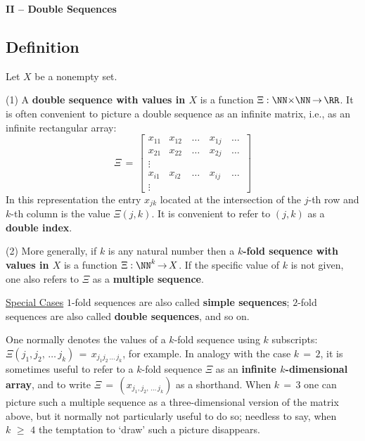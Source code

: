 {\V
\V

        {\bf II -- Double Sequences}

\V
\V


            \subsection{\small{\bf Definition}}
            \label{DefC100.70}

        Let $X$ be a nonempty set.

\V

        (1) A {\bf double sequence with values in $X$} is a function ${\Xi}:{\NN}{\times}{\NN} \,{\rightarrow}\, {\RR}$.
    It is often convenient to picture a double sequence as an infinite matrix, i.e., as an infinite rectangular array:
        \begin{displaymath}
        {\Xi} \,=\, \left[
        \begin{array}{llclc}
        x_{11} & x_{12} & \,{\ldots}\,& x_{1j} & \,{\ldots}\, \\
        x_{21} & x_{22} & \,{\ldots}\,& x_{2j} & \,{\ldots}\, \\
      {\vdots} &        &             &        &              \\
        x_{i1} & x_{i2} & \,{\ldots}\,& x_{ij} & \,{\ldots}\, \\
      {\vdots} &        &             &        &
        \end{array}
                                \right]
        \end{displaymath}
    In this representation the entry $x_{jk}$ located at the intersection of the $j$-th row and $k$-th column is the value ${\Xi}(j,k)$.
    It is convenient to refer to $(j,k)$ as a {\bf double index}.

\V

        (2) More generally, if $k$ is any natural number then a {\bf $k$-fold sequence with values in $X$} is a function ${\Xi}:{\NN}^{k} \,{\rightarrow}\, X$.
    If the specific value of $k$ is not given, one also refers to ${\Xi}$ as a {\bf multiple sequence}.

        \underline{Special Cases} $1$-fold sequences are also called {\bf simple sequences}; $2$-fold sequences are also called {\bf double sequences}, and so on.

    One normally denotes the values of a $k$-fold sequence using $k$ subscripts:
    ${\Xi}(j_{1},j_{2},\,{\ldots}\,j_{k}) \,=\, x_{j_{1}j_{2}\,{\ldots}\,j_{k}}$, for example.
    In analogy with the case $k \,=\, 2$, it is sometimes useful to refer to a $k$-fold sequence ${\Xi}$ as an {\bf infinite $k$-dimensional array}, and to write ${\Xi} \,=\, (x_{j_{1},j_{2},\,{\ldots}\,j_{k}})$ as a shorthand.
    When $k \,=\, 3$ one can picture such a multiple sequence as a three-dimensional version of the matrix above,
    but it normally not particularly useful to do so; needless to say, when $k\,\,{\geq}\,\,4$ the temptation to `draw' such a picture disappears.

}
